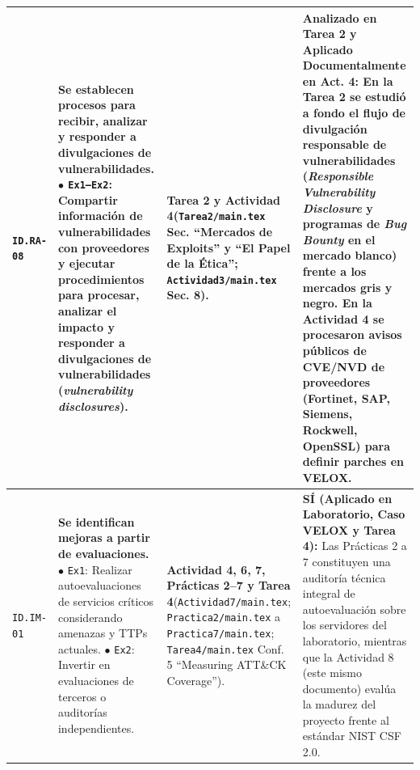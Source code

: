 \documentclass[letterpaper,11pt]{article}
\begin{document}
\begin{longtable}{|C{1.5cm}|L{5.3cm}|L{4.3cm}|L{5.8cm}|}
\texttt{ID.RA-08} &
\textbf{Se establecen procesos para recibir, analizar y responder a divulgaciones de vulnerabilidades.}\newline
$\bullet$ \texttt{Ex1--Ex2}: Compartir información de vulnerabilidades con proveedores y ejecutar procedimientos para procesar, analizar el impacto y responder a divulgaciones de vulnerabilidades (\textit{vulnerability disclosures}). &
\textbf{Tarea 2 y Actividad 4}\newline (\texttt{Tarea2/main.tex} Sec. ``Mercados de Exploits'' y ``El Papel de la Ética''; \texttt{Actividad3/main.tex} Sec. 8). &
\textbf{Analizado en Tarea 2 y Aplicado Documentalmente en Act. 4:}\newline
En la \textbf{Tarea 2} se estudió a fondo el flujo de divulgación responsable de vulnerabilidades (\textit{Responsible Vulnerability Disclosure} y programas de \textit{Bug Bounty} en el mercado blanco) frente a los mercados gris y negro. En la \textbf{Actividad 4} se procesaron avisos públicos de CVE/NVD de proveedores (Fortinet, SAP, Siemens, Rockwell, OpenSSL) para definir parches en VELOX. \\
\hline

\texttt{ID.IM-01} &
\textbf{Se identifican mejoras a partir de evaluaciones.}\newline
$\bullet$ \texttt{Ex1}: Realizar autoevaluaciones de servicios críticos considerando amenazas y TTPs actuales.\newline
$\bullet$ \texttt{Ex2}: Invertir en evaluaciones de terceros o auditorías independientes. &
\textbf{Actividad 4, 6, 7, Prácticas 2--7 y Tarea 4}\newline (\texttt{Actividad7/main.tex}; \texttt{Practica2/main.tex} a \texttt{Practica7/main.tex}; \texttt{Tarea4/main.tex} Conf. 5 ``Measuring ATT\&CK Coverage''). &
\textbf{SÍ (Aplicado en Laboratorio, Caso VELOX y Tarea 4):}\newline
Las Prácticas 2 a 7 constituyen una auditoría técnica integral de autoevaluación sobre los servidores del laboratorio, mientras que la Actividad 8 (este mismo documento) evalúa la madurez del proyecto frente al estándar NIST CSF 2.0. \\
\hline


\end{longtable}
\end{document}
